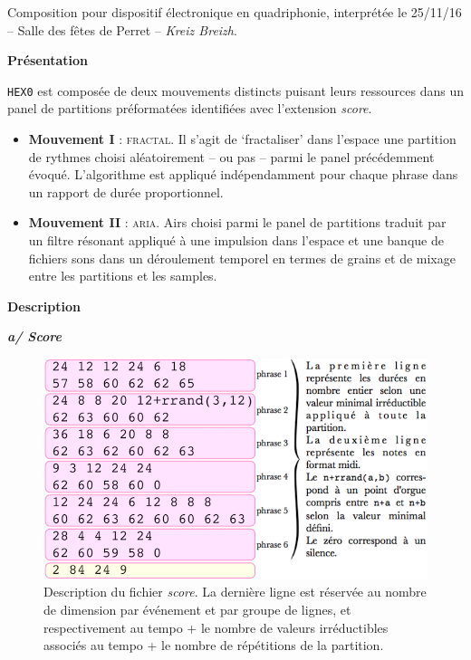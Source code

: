 \smallskip

 Composition pour dispositif \'electronique en quadriphonie, interpr\'et\'ee le 25/11/16 -- Salle des f\^etes de Perret -- \textit{Kreiz Breizh}.

\bigskip

\noindent \textbf{{\large Pr\'esentation}}
\hrulefill

\bigskip

\texttt{HEX0} est compos\'ee de deux mouvements distincts puisant leurs ressources  dans un panel de partitions \citep{mbb} pr\'eformat\'ees identifi\'ees avec l'extension \textsl{score}. 

\begin{itemize}[leftmargin=0.4in]
\item \textbf{Mouvement I} : \textsc{fractal}. Il s'agit de `fractaliser' dans l'espace une partition de rythmes choisi al\'eatoirement -- ou pas -- parmi le panel pr\'ec\'edemment \'evoqu\'e. L'algorithme est appliqu\'e ind\'ependamment pour chaque phrase dans un rapport de dur\'ee proportionnel.

\item \textbf{Mouvement II} : \textsc{aria}. Airs choisi parmi le panel de partitions traduit par un filtre r\'esonant appliqu\'e \`a une impulsion dans l'espace et une banque de fichiers sons dans un d\'eroulement temporel en termes de grains et de mixage entre les partitions et les samples.
\end{itemize}

\bigskip

\noindent \textbf{{\large Description}}
\hrulefill

\bigskip

  \textbf{\textit{a/ Score }}
  
  \smallskip
  
  \begin{figure}[!hbt]
\begin{center}
\includegraphics[scale=2.6]{img/4220}
\caption{Description du fichier \textsl{score}. La derni\`ere ligne est r\'eserv\'ee 
au nombre de dimension par \'ev\'enement et par groupe de lignes, et respectivement au tempo + le nombre de valeurs irr\'eductibles associ\'es au tempo + le nombre de r\'ep\'etitions de la partition.}
\label{fig:score}
\end{center}
\end{figure}

